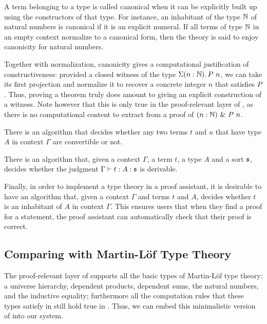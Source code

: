A term belonging to a type is called canonical when it can be explicitly built up
using the constructors of that type. For instance, an inhabitant of the type \( \Nat \) of natural
numbers is canonical if it is an explicit numeral. If all terms of type \( \Nat \) in an empty
context normalize to a canonical form, then the theory is said to enjoy canonicity for natural
numbers.

Together with normalization, canonicity gives a computational justification of
constructiveness: 
% 
provided a closed witness of the type \( \Depsum[n]{\Nat}{P\ n} \), we can take 
its first projection and normalize it to recover a concrete integer \( n \) that 
satisfies \( P \).
% 
Thus, proving a theorem truly does amount to giving an explicit construction of a 
witness.
% 
Note however that this is only true in the proof-relevant layer of \SetoidCC, as 
there is no computational content to extract from a proof of 
\( \Exists[n]{\Nat}{P\ n} \).

\begin{theorem}[Decidability]
	There is an algorithm that decides whether any two terms \( t \) and 
	\( u \) that have type \( A \) in context \( \Gamma \) are convertible 
	or not.

	There is an algorithm that, given a context \( \Gamma \), a term \( t \), 
	a type \( A \) and a sort \( \Univ \), decides whether the judgment 
	\( \tytmannotated{\Gamma}{t}{A}{\Univ} \) is derivable.
\end{theorem}

Finally, in order to implement a type theory in a proof assistant, it is desirable to have an
algorithm that, given a context \( \Gamma \) and terms \( t \) and \( A \), decides whether \( t \)
is an inhabitant of \( A \) in context \( \Gamma \). This ensures users that when they find a
proof for a statement, the proof assistant can automatically check that their proof is correct.

\subsection{Comparing \SetoidCC with Martin-Löf Type Theory}
 
The proof-relevant layer of \SetoidCC supports all the basic types of Martin-Löf 
type theory: a universe hierarchy, dependent products, dependent sums, the natural 
numbers, and the inductive equality; furthermore all the computation rules that 
these types satisfy in \MLTT still hold true in \SetoidCC.
% 
Thus, we can embed this minimalistic version of \MLTT into our system.

